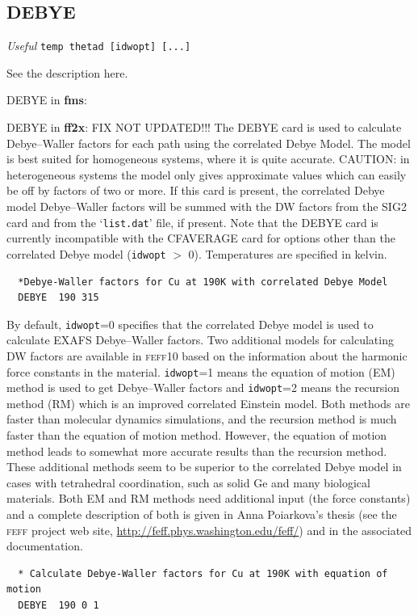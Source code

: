 \documentclass[11pt,oneside]{report} %
\renewcommand{\htmladdnormallink}[2]{\href{#2}{#1}}
\renewcommand{\htmlref}[2]{\hyperlink{#2}{#1}}
\newcommand{\program}[1]{\textsc{#1}}
\newcommand{\feff}{\program{feff}}
\newcommand{\vnum}{10}
\newcommand{\feffcur}{\feff\vnum}
\newenvironment{Card}[4]%
      {\vspace{3ex}%
        \subsection{#1}
        \quad\textsl{#3}\newline
        \quad\texttt{#2}\newline%
        \label{card:#4}\\}
      {}
\newcommand{\file}[1]{`\texttt{#1}'}
\newcommand{\module}[1]{\textrm{\bf{#1}}}
\renewcommand{\htmlref}[2]{{#1}} %
\begin{document}
\begin{Card}{DEBYE}{temp thetad [idwopt] [...]}{Useful}{deb1}
\begin{latexonly}
  See the description \htmlref{here}{car:deb2}.
\end{latexonly}
 \begin{htmlonly}
  {\large DEBYE in \module{fms}:}\newline
 \end{htmlonly}  

 \begin{htmlonly}
  {\large DEBYE in \module{ff2x}:}\newline
 FIX  NOT UPDATED!!!
  The DEBYE card is used to calculate Debye--Waller factors for each
  path using the correlated Debye Model. The model is best suited for
  homogeneous systems, where it is quite accurate. CAUTION: in
  heterogeneous systems the model only gives approximate values which
  can easily be off by factors of two or more. If this card is present, 
  the correlated Debye model Debye--Waller factors will be summed with the 
  DW factors from the \htmlref{SIG2}{card:sig} card and from the \file{list.dat} 
  file, if present. Note that the DEBYE card is currently incompatible with the 
  \htmlref{CFAVERAGE}{card:cfa} card for options other than the correlated Debye 
  model (\texttt{idwopt} $>$ 0). Temperatures are specified in kelvin.

\begin{verbatim}
  *Debye-Waller factors for Cu at 190K with correlated Debye Model
  DEBYE  190 315
\end{verbatim}

  By default, \texttt{idwopt}=0 specifies that the correlated Debye model 
  is used to calculate EXAFS Debye--Waller factors. Two additional models for
  calculating DW factors are available in {\feffcur} based on the information
  about the harmonic force constants in the material. \texttt{idwopt}=1
  means the equation of motion (EM) method is used to get Debye--Waller
  factors and \texttt{idwopt}=2 means the recursion method (RM) which
  is an improved correlated Einstein model. Both methods are faster than 
  molecular dynamics simulations, and the recursion method is much faster 
  than the equation of motion method. However, the equation of motion method 
  leads to somewhat more accurate results than the recursion method. These 
  additional methods seem to be superior to the correlated Debye model in cases 
  with tetrahedral coordination, such as solid Ge and many biological materials. 
  Both EM and RM methods need additional input (the force constants) and a 
  complete description of both is given in Anna Poiarkova's thesis (see the 
  {\feff} project web site, \htmladdnormallink{http://feff.phys.washington.edu/feff/}{http://feff.phys.washington.edu/feff/Docs/Docs.html}) 
  and in the associated documentation.

\begin{verbatim}
  * Calculate Debye-Waller factors for Cu at 190K with equation of motion
  DEBYE  190 0 1
\end{verbatim}
 \end{htmlonly}

\end{Card}
\end{document}
